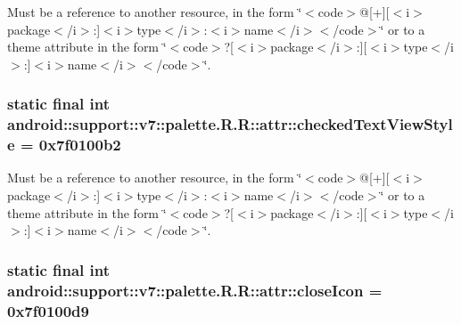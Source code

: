Must be a reference to another resource, in the form \char`\"{}$<$code$>$@\mbox{[}+\mbox{]}\mbox{[}$<$i$>$package$<$/i$>$:\mbox{]}$<$i$>$type$<$/i$>$:$<$i$>$name$<$/i$>$$<$/code$>$\char`\"{} or to a theme attribute in the form \char`\"{}$<$code$>$?\mbox{[}$<$i$>$package$<$/i$>$:\mbox{]}\mbox{[}$<$i$>$type$<$/i$>$:\mbox{]}$<$i$>$name$<$/i$>$$<$/code$>$\char`\"{}. \hypertarget{classandroid_1_1support_1_1v7_1_1palette_1_1_r_1_1attr_8c8cc4ee0ea2d8584d281eb943c20ce5}{
\subsubsection[{checkedTextViewStyle}]{\setlength{\rightskip}{0pt plus 5cm}static final int android::support::v7::palette.R.R::attr::checkedTextViewStyle = 0x7f0100b2}}
\label{classandroid_1_1support_1_1v7_1_1palette_1_1_r_1_1attr_8c8cc4ee0ea2d8584d281eb943c20ce5}


Must be a reference to another resource, in the form \char`\"{}$<$code$>$@\mbox{[}+\mbox{]}\mbox{[}$<$i$>$package$<$/i$>$:\mbox{]}$<$i$>$type$<$/i$>$:$<$i$>$name$<$/i$>$$<$/code$>$\char`\"{} or to a theme attribute in the form \char`\"{}$<$code$>$?\mbox{[}$<$i$>$package$<$/i$>$:\mbox{]}\mbox{[}$<$i$>$type$<$/i$>$:\mbox{]}$<$i$>$name$<$/i$>$$<$/code$>$\char`\"{}. \hypertarget{classandroid_1_1support_1_1v7_1_1palette_1_1_r_1_1attr_d9ac744185002bedc4104a2a4ae7468a}{
\subsubsection[{closeIcon}]{\setlength{\rightskip}{0pt plus 5cm}static final int android::support::v7::palette.R.R::attr::closeIcon = 0x7f0100d9}}
\label{classandroid_1_1support_1_1v7_1_1palette_1_1_r_1_1attr_d9ac744185002bedc4104a2a4ae7468a}


